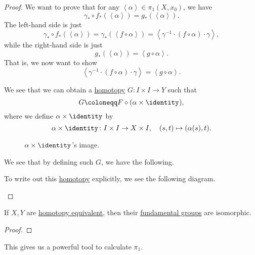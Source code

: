 \begin{proof}
	We want to prove that for any \(\left< \alpha  \right> \in \pi _1(X, x_0)\), we have
	\[
		\gamma _\ast \circ f_\ast(\left< \alpha  \right> ) = g_\ast (\left< \alpha  \right> ).
	\]
	The left-hand side is just
	\[
		\gamma _\ast \circ f_\ast (\left< \alpha  \right> )= \gamma _\ast \left(\left< f\circ \alpha  \right> \right) = \left< \gamma ^{-1} \cdot \left(f\circ \alpha \right)\cdot \gamma  \right>,
	\]
	while the right-hand side is just
	\[
		g_\ast (\left< \alpha  \right> )= \left< g\circ \alpha  \right>.
	\]
	That is, we now want to show
	\[
		\left< \gamma ^{-1} \cdot (f\circ \alpha ) \cdot \gamma \right> = \left< g\circ \alpha  \right>.
	\]

	\begin{figure}[H]
		\centering
		\label{fig:pf:lma:lec9}
	\end{figure}
	We see that we can obtain a \hyperref[def:homotopy]{homotopy} \(G\colon I\times I\to Y\) such that
	\[
		G\coloneqq F\circ (\alpha \times \identity_{}),
	\]
	where we define \(\alpha \times \identity_{} \) by
	\[
		\alpha \times \identity_{} \colon I\times I\to X\times I,\quad (s, t)\mapsto (\alpha (s), t).
	\]
	\begin{figure}[H]
		\centering
		\caption{\(\alpha\times\identity_{} \)'s image.}
		\label{fig:pf:lma:lec9-2}
	\end{figure}
	We see that by defining such \(G\), we have the following.
	\begin{figure}[H]
		\centering
		\label{fig:pf:lma:lec9-3}
	\end{figure}
	To write out this \hyperref[def:homotopy]{homotopy} explicitly, we see the following diagram.
	\begin{figure}[H]
		\centering
		\label{fig:pf:lma:lec9-4}
	\end{figure}
\end{proof}

\begin{theorem}\label{thm:fundamental-group-is-a-homotopy-invariant}
	If \(X, Y\) are \hyperref[def:homotopy-equivalence]{homotopy equivalent}, then their \hyperref[def:fundamental-group]{fundamental groups} are isomorphic.
\end{theorem}
\begin{proof}
\end{proof}

\begin{remark}
	This gives us a powerful tool to calculate \(\pi _1\).
\end{remark}

